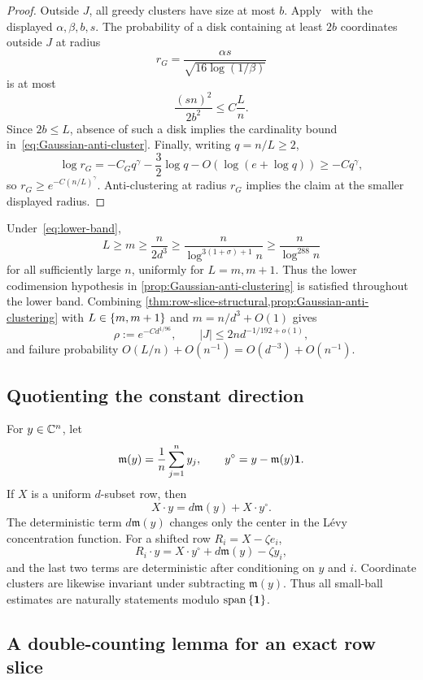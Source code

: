 \begin{proof}
Outside $J$, all greedy clusters have size at most $b$. Apply~\cite[Lemmas~4.8 and 4.9]{LLTTY21} with the displayed $\alpha,\beta,b,s$. The probability of a disk containing at least $2b$ coordinates outside $J$ at radius
\[
  r_G=\frac{\alpha s}{\sqrt{16\log(1/\beta)}}
\]
is at most
\[
  \frac{(sn)^2}{2b^2}\le C\frac Ln.
\]
Since $2b\le L$, absence of such a disk implies the cardinality bound in~\eqref{eq:Gaussian-anti-cluster}. Finally, writing $q=n/L\ge2$,
\[
  \log r_G
  =-C_Gq^\gamma-\frac32\log q-O(\log(e+\log q))
  \ge-Cq^\gamma,
\]
so $r_G\ge e^{-C(n/L)^\gamma}$. Anti-clustering at radius $r_G$ implies the claim at the smaller displayed radius.
\end{proof}

Under~\eqref{eq:lower-band},
\[
  L\ge m\ge\frac{n}{2d^3}
  \ge\frac{n}{\log^{3(1+\sigma)+1}n}
  \ge\frac{n}{\log^{288}n}
\]
for all sufficiently large $n$, uniformly for $L=m,m+1$. Thus the lower codimension hypothesis in 
\cref{prop:Gaussian-anti-clustering} is satisfied throughout the lower band. Combining 
\cref{thm:row-slice-structural,prop:Gaussian-anti-clustering} with $L\in\left\{m,m+1\right\}$ and $m=n/d^3+O(1)$ gives
\begin{equation}\label{eq:normal-scales}
  \rho:=e^{-Cd^{1/96}},
  \qquad
  |J|\le2nd^{-1/192+o(1)},
\end{equation}
and failure probability $O(L/n)+O(n^{-1})=O(d^{-3})+O(n^{-1})$.

\subsection{Quotienting the constant direction}

For $y\in\mathbb C^n$, let
\[
  \mathfrak m(y)=\frac1n\sum_{j=1}^ny_j,
  \qquad
  y^\circ=y-\mathfrak m(y)\mathbf 1.
\]
If $X$ is a uniform $d$-subset row, then
\[
  X\cdot y=d\mathfrak m(y)+X\cdot y^\circ.
\]
The deterministic term $d\mathfrak m(y)$ changes only the center in the L\'evy concentration function. For a shifted row $R_i=X-\zeta e_i$,
\[
  R_i\cdot y=X\cdot y^\circ+d\mathfrak m(y)-\zeta y_i,
\]
and the last two terms are deterministic after conditioning on $y$ and $i$. Coordinate clusters are likewise invariant under subtracting $\mathfrak m(y)$. Thus all small-ball estimates are naturally statements modulo $\operatorname{span}\left\{\mathbf 1\right\}$.

\subsection{A double-counting lemma for an exact row slice}

